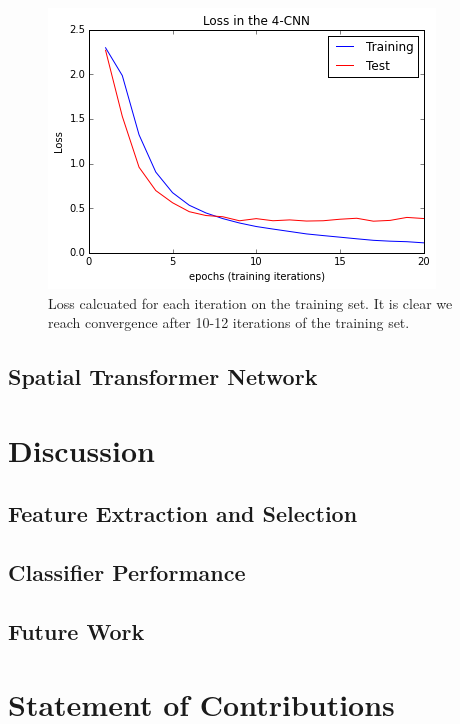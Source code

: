 \documentclass[conference]{IEEEtran}
\begin{document}
\begin{figure}[h]
	\includegraphics[scale=0.5]{loss4CNN.png}
	\caption{Loss calcuated for each iteration on the training set. It is clear we reach convergence after 10-12 iterations of the training set.}
	\label{4CNN_loss}
\end{figure}


\subsection{Spatial Transformer Network}



\section{Discussion}

\subsection{Feature Extraction and Selection}



\subsection{Classifier Performance}

\subsection{Future Work}



\section{Statement of Contributions}
\end{document}
